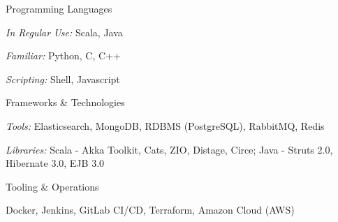 

\begin{cvskills}

  \cvskill
  {Programming Languages} %
  {
  \begin{cvskillsitems} %
    \item {\emph{In Regular Use:} Scala, Java} %
    \item {\emph{Familiar:} Python, C, C++} %
    \item {\emph{Scripting:} Shell, Javascript} %
  \end{cvskillsitems}
  }

  \cvskill
  {Frameworks \& Technologies} %
  {
  \begin{cvskillsitems} %
    \item {\emph{Tools:} Elasticsearch, MongoDB, RDBMS (PostgreSQL), RabbitMQ, Redis} %
    \item {\emph{Libraries:} Scala - Akka Toolkit, Cats, ZIO, Distage, Circe; Java - Struts 2.0, Hibernate 3.0, EJB 3.0} %
  \end{cvskillsitems}
  }


  \cvskill
  {Tooling \& Operations} %
  {
  \begin{cvskillsitems} %
    \item {Docker, Jenkins, GitLab CI/CD, Terraform, Amazon Cloud (AWS)} %
  \end{cvskillsitems}
  }

\end{cvskills}
